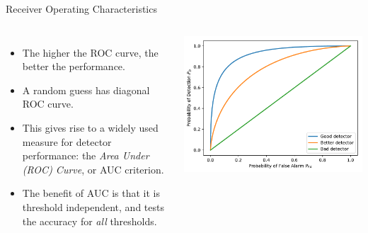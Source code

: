 \documentclass[10pt, aspectratio=169]{beamer} %
\begin{document}
\begin{frame}[fragile,allowframebreaks=0.8]
 {Receiver Operating Characteristics}
\begin{columns}

\begin{itemize}
\item The higher the ROC curve, the better the performance. 
\item A random guess has diagonal ROC curve.
\item This gives rise to a widely used measure for detector
performance: the \emph{Area Under (ROC) Curve}, or AUC criterion.
\item The benefit of AUC is that it is threshold independent, and tests
the accuracy for \textit{all} thresholds.
\end{itemize}

\centerline{\includegraphics[width=\textwidth]{roc_difficulty.pdf}}

\end{columns}

\end{frame}
\end{document}
